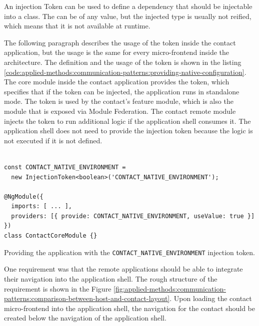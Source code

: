 \noindent An injection Token can be used to define a dependency that should be injectable into a class. The can be of any value, but the injected type is usually not reified, which means that it is not available at runtime. \cite{misc:-:applied-methods:communication:angular-injection-token}


\bigskip

\noindent The following paragraph describes the usage of the token inside the contact application, but the usage is the same for every micro-frontend inside the architecture. The definition and the usage of the token is shown in the listing \ref{code:applied-methods:communication-patterns:providing-native-configuration}. The core module inside the contact application provides the token, which specifies that if the token can be injected, the application runs in standalone mode. The token is used by the contact's feature module, which is also the module that is exposed via Module Federation. The contact remote module injects the token to run additional logic if the application shell consumes it. The application shell does not need to provide the injection token because the logic is not executed if it is not defined.

\ifshowListings
  \begin{listing}[H]
  \begin{verbatim}

const CONTACT_NATIVE_ENVIRONMENT = 
  new InjectionToken<boolean>('CONTACT_NATIVE_ENVIRONMENT');

@NgModule({
  imports: [ ... ],
  providers: [{ provide: CONTACT_NATIVE_ENVIRONMENT, useValue: true }]
})
class ContactCoreModule {}
  \end{verbatim}
  \caption{Providing the application with the \texttt{CONTACT\_NATIVE\_ENVIRONMENT} injection token.}\label{code:applied-methods:communication-patterns:providing-native-configuration}
  \end{listing}
\fi

\noindent One requirement was that the remote applications should be able to integrate their navigation into the application shell. The rough structure of the requirement is shown in the Figure \ref{fig:applied-methods:communication-patterns:comparison-between-host-and-contact-layout}. Upon loading the contact micro-frontend into the application shell, the navigation for the contact should be created below the navigation of the application shell.

